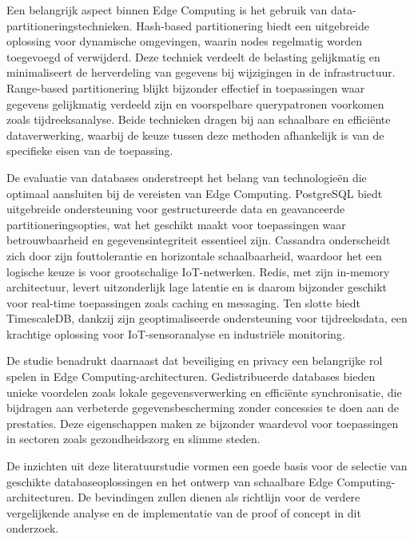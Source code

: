     Een belangrijk aspect binnen Edge Computing is het gebruik van data-partitioneringstechnieken. Hash-based partitionering biedt een uitgebreide oplossing voor dynamische omgevingen, waarin nodes regelmatig worden toegevoegd of verwijderd. Deze techniek verdeelt de belasting gelijkmatig en minimaliseert de herverdeling van gegevens bij wijzigingen in de infrastructuur. Range-based partitionering blijkt bijzonder effectief in toepassingen waar gegevens gelijkmatig verdeeld zijn en voorspelbare querypatronen voorkomen zoals tijdreeksanalyse. Beide technieken dragen bij aan schaalbare en efficiënte dataverwerking, waarbij de keuze tussen deze methoden afhankelijk is van de specifieke eisen van de toepassing.

    De evaluatie van databases onderstreept het belang van technologieën die optimaal aansluiten bij de vereisten van Edge Computing. PostgreSQL biedt uitgebreide ondersteuning voor gestructureerde data en geavanceerde partitioneringsopties, wat het geschikt maakt voor toepassingen waar betrouwbaarheid en gegevensintegriteit essentieel zijn. Cassandra onderscheidt zich door zijn fouttolerantie en horizontale schaalbaarheid, waardoor het een logische keuze is voor grootschalige IoT-netwerken. Redis, met zijn in-memory architectuur, levert uitzonderlijk lage latentie en is daarom bijzonder geschikt voor real-time toepassingen zoals caching en messaging. Ten slotte biedt TimescaleDB, dankzij zijn geoptimaliseerde ondersteuning voor tijdreeksdata, een krachtige oplossing voor IoT-sensoranalyse en industriële monitoring.

    De studie benadrukt daarnaast dat beveiliging en privacy een belangrijke rol spelen in Edge Computing-architecturen. Gedistribueerde databases bieden unieke voordelen zoals lokale gegevensverwerking en efficiënte synchronisatie, die bijdragen aan verbeterde gegevensbescherming zonder concessies te doen aan de prestaties. Deze eigenschappen maken ze bijzonder waardevol voor toepassingen in sectoren zoals gezondheidszorg en slimme steden.

    De inzichten uit deze literatuurstudie vormen een goede basis voor de selectie van geschikte databaseoplossingen en het ontwerp van schaalbare Edge Computing-architecturen. De bevindingen zullen dienen als richtlijn voor de verdere vergelijkende analyse en de implementatie van de proof of concept in dit onderzoek.